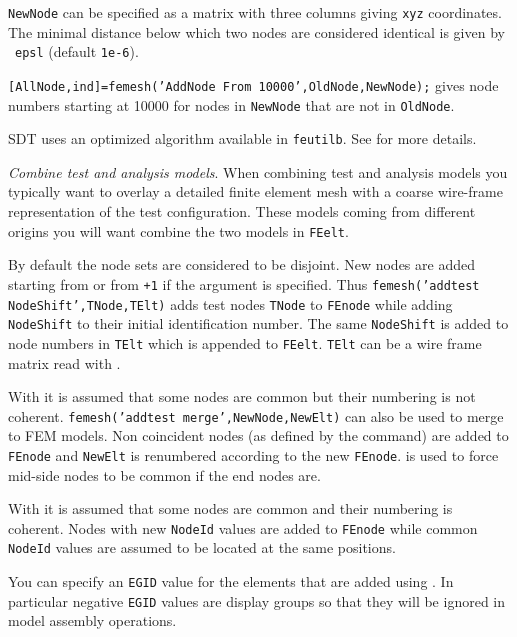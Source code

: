 {\tt NewNode} can be specified as a matrix with three columns giving {\tt xyz} coordinates. The minimal distance below which two nodes are considered identical is given by \sdtdef\ {\tt epsl} (default {\tt 1e-6}).

{\tt [AllNode,ind]=femesh('AddNode From 10000',OldNode,NewNode);} gives node numbers starting at 10000 for nodes in {\tt NewNode} that are not in {\tt OldNode}.

\begin{SDT}
SDT uses an optimized algorithm available in {\tt feutilb}. See  for more details.
\end{SDT}


{\sl Combine test and analysis models}. When combining test and analysis models you typically want to overlay a detailed finite element mesh with a coarse wire-frame representation of the test configuration. These models coming from different origins you will want combine the two models in {\tt FEelt}.

By default the node sets are considered to be disjoint. New nodes are added starting from  or from {\tt {}+1} if the argument is specified. Thus {\tt femesh('addtest {\tsi NodeShift}',TNode,TElt)} adds test nodes {\tt TNode} to {\tt FEnode} while adding {\tt NodeShift} to their initial identification number. The same {\tt NodeShift} is added to node numbers in {\tt TElt} which is appended to {\tt FEelt}. {\tt TElt} can be a wire frame matrix read with \ufread.

With  it is assumed that some nodes are common but their numbering is not coherent. {\tt femesh('addtest merge',NewNode,NewElt)} can also be used to merge to FEM models. Non coincident nodes (as defined by the  command) are added to {\tt FEnode} and {\tt NewElt} is renumbered according to the new {\tt FEnode}.  is used to force mid-side nodes to be common if the end nodes are.

With  it is assumed that some nodes are common and their numbering is coherent. Nodes with new {\tt NodeId} values are added to {\tt FEnode} while common {\tt NodeId} values are assumed to be located at the same positions.

You can specify an {\tt EGID} value for the elements that are added using . In particular negative {\tt EGID} values are display groups so that they will be ignored in model assembly operations.

